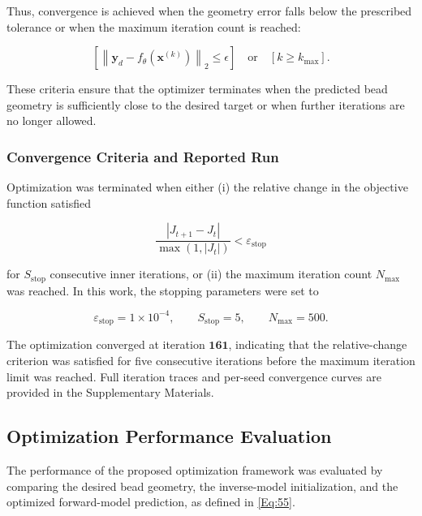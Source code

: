\documentclass[11pt]{article}
\begin{document}
Thus, convergence is achieved when the geometry error falls below the prescribed tolerance or when the maximum iteration count is reached:

\begin{tcolorbox}[colback=white,colframe=black,boxrule=0.5pt,arc=2pt]
\small
\begin{equation}
\left[
\left\|
\mathbf{y}_{d}
-
f_{\theta}\left(\mathbf{x}^{(k)}\right)
\right\|_{2}
\leq
\epsilon
\right]
\quad
\mathrm{or}
\quad
\left[
k \geq k_{\max}
\right].
\end{equation}
\end{tcolorbox}

These criteria ensure that the optimizer terminates when the predicted bead geometry is sufficiently close to the desired target or when further iterations are no longer allowed.

\subsubsection{Convergence Criteria and Reported Run}

Optimization was terminated when either (i) the relative change in the objective function satisfied

$$
\frac{|J_{t+1}-J_t|}{\max(1,|J_t|)} < \varepsilon_{\mathrm{stop}}
$$

for \(S_{\mathrm{stop}}\) consecutive inner iterations, or (ii) the maximum iteration count \(N_{\max}\) was reached. In this work, the stopping parameters were set to

$$
\varepsilon_{\mathrm{stop}}=1\times10^{-4},\qquad
S_{\mathrm{stop}}=5,\qquad
N_{\max}=500.
$$

The optimization converged at iteration \(\mathbf{161}\), indicating that the relative-change criterion was satisfied for five consecutive iterations before the maximum iteration limit was reached. Full iteration traces and per-seed convergence curves are provided in the Supplementary Materials.



\subsection{Optimization Performance Evaluation}
\label{Optimization Performance Evaluation}

The performance of the proposed optimization framework was evaluated by comparing the desired bead geometry, the inverse-model initialization, and the optimized forward-model prediction, as defined in \ref{Eq:55}.
\end{document}
